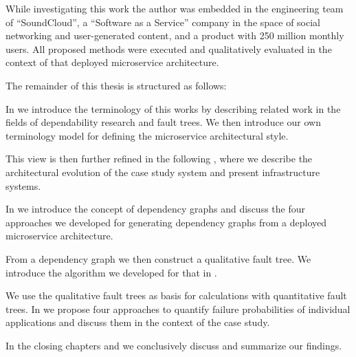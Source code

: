 While investigating this work the author was embedded in the engineering team of ``SoundCloud'', a ``Software as a Service'' company in the space of social networking and user-generated content, and a product with 250 million monthly users. All proposed methods were executed and qualitatively evaluated in the context of that deployed microservice architecture.

The remainder of this thesis is structured as follows:

In  we introduce the terminology of this works by describing related work in the fields of dependability research and fault trees. We then introduce our own terminology model for defining the microservice architectural style.

This view is then further refined in the following , where we describe the architectural evolution of the case study system and present infrastructure systems.

In  we introduce the concept of dependency graphs and discuss the four approaches we developed for generating dependency graphs from a deployed microservice architecture.

From a dependency graph we then construct a qualitative fault tree. We introduce the algorithm we developed for that in .

We use the qualitative fault trees as basis for calculations with quantitative fault trees. In  we propose four approaches to quantify failure probabilities of individual applications and discuss them in the context of the case study.

In the closing chapters  and  we conclusively discuss and summarize our findings.